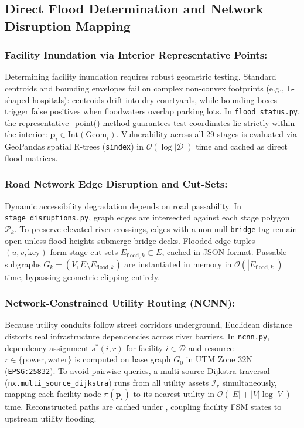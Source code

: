 \subsection{Direct Flood Determination and Network Disruption Mapping}
\label{subsec:hazard-mapping}

\subsubsection{Facility Inundation via Interior Representative Points:}
Determining facility inundation requires robust geometric testing.
Standard centroids and bounding envelopes fail on complex non-convex footprints (e.g., L-shaped hospitals): centroids drift into dry courtyards, while bounding boxes trigger false positives when floodwaters overlap parking lots.
In \texttt{flood\_status.py}, the representative\_point() method guarantees test coordinates lie strictly within the interior: $\mathbf{p}_i \in \text{Int}(\text{Geom}_i)$.
Vulnerability across all 29 stages is evaluated via GeoPandas spatial R-trees (\texttt{sindex}) in $\mathcal{O}(\log |\mathcal{D}|)$ time and cached as direct flood matrices.

\subsubsection{Road Network Edge Disruption and Cut-Sets:}
Dynamic accessibility degradation depends on road passability.
In \texttt{stage\_disruptions.py}, graph edges are intersected against each stage polygon $\mathcal{P}_k$.
To preserve elevated river crossings, edges with a non-null \texttt{bridge} tag remain open unless flood heights submerge bridge decks.
Flooded edge tuples $(u, v, \text{key})$ form stage cut-sets $E_{\text{flood}, k} \subset E$, cached in JSON format.
Passable subgraphs $G_k = (V, E \setminus E_{\text{flood}, k})$ are instantiated in memory in $\mathcal{O}(|E_{\text{flood}, k}|)$ time, bypassing geometric clipping entirely.

\subsubsection{Network-Constrained Utility Routing (NCNN):}
Because utility conduits follow street corridors underground, Euclidean distance distorts real infrastructure dependencies across river barriers.
In \texttt{ncnn.py}, dependency assignment $s^*(i, r)$ for facility $i \in \mathcal{D}$ and resource $r \in \{\text{power}, \text{water}\}$ is computed on base graph $G_0$ in UTM Zone 32N (\texttt{EPSG:25832}).
To avoid pairwise queries, a multi-source Dijkstra traversal (\texttt{nx.multi\_source\_dijkstra}) runs from all utility assets $\mathcal{I}_r$ simultaneously, mapping each facility node $\pi(\mathbf{p}_i)$ to its nearest utility in $\mathcal{O}(|E| + |V|\log |V|)$ time.
Reconstructed paths are cached under , coupling facility FSM states to upstream utility flooding.

